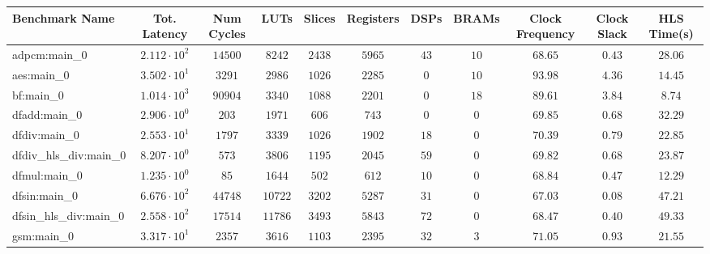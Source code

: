\begin{tabular}{|l|c|c|c|c|c|c|c|c|c|c|}
\hline
Benchmark Name          & Tot. Latency           & Num Cycles & LUTs      & Slices    & Registers & DSPs    & BRAMs   & Clock Frequency & Clock Slack & HLS Time(s) \\
\hline
adpcm:main\_0           & $ 2.112 \cdot 10^{2} $ & $ 14500  $ & $ 8242  $ & $ 2438  $ & $ 5965  $ & $ 43  $ & $ 10  $ & $ 68.65       $ & $ 0.43    $ & $ 28.06   $ \\
aes:main\_0             & $ 3.502 \cdot 10^{1} $ & $ 3291   $ & $ 2986  $ & $ 1026  $ & $ 2285  $ & $ 0   $ & $ 10  $ & $ 93.98       $ & $ 4.36    $ & $ 14.45   $ \\
bf:main\_0              & $ 1.014 \cdot 10^{3} $ & $ 90904  $ & $ 3340  $ & $ 1088  $ & $ 2201  $ & $ 0   $ & $ 18  $ & $ 89.61       $ & $ 3.84    $ & $ 8.74    $ \\
dfadd:main\_0           & $ 2.906 \cdot 10^{0} $ & $ 203    $ & $ 1971  $ & $ 606   $ & $ 743   $ & $ 0   $ & $ 0   $ & $ 69.85       $ & $ 0.68    $ & $ 32.29   $ \\
dfdiv:main\_0           & $ 2.553 \cdot 10^{1} $ & $ 1797   $ & $ 3339  $ & $ 1026  $ & $ 1902  $ & $ 18  $ & $ 0   $ & $ 70.39       $ & $ 0.79    $ & $ 22.85   $ \\
dfdiv\_hls\_div:main\_0 & $ 8.207 \cdot 10^{0} $ & $ 573    $ & $ 3806  $ & $ 1195  $ & $ 2045  $ & $ 59  $ & $ 0   $ & $ 69.82       $ & $ 0.68    $ & $ 23.87   $ \\
dfmul:main\_0           & $ 1.235 \cdot 10^{0} $ & $ 85     $ & $ 1644  $ & $ 502   $ & $ 612   $ & $ 10  $ & $ 0   $ & $ 68.84       $ & $ 0.47    $ & $ 12.29   $ \\
dfsin:main\_0           & $ 6.676 \cdot 10^{2} $ & $ 44748  $ & $ 10722 $ & $ 3202  $ & $ 5287  $ & $ 31  $ & $ 0   $ & $ 67.03       $ & $ 0.08    $ & $ 47.21   $ \\
dfsin\_hls\_div:main\_0 & $ 2.558 \cdot 10^{2} $ & $ 17514  $ & $ 11786 $ & $ 3493  $ & $ 5843  $ & $ 72  $ & $ 0   $ & $ 68.47       $ & $ 0.40    $ & $ 49.33   $ \\
gsm:main\_0             & $ 3.317 \cdot 10^{1} $ & $ 2357   $ & $ 3616  $ & $ 1103  $ & $ 2395  $ & $ 32  $ & $ 3   $ & $ 71.05       $ & $ 0.93    $ & $ 21.55   $ \\

\end{tabular}
